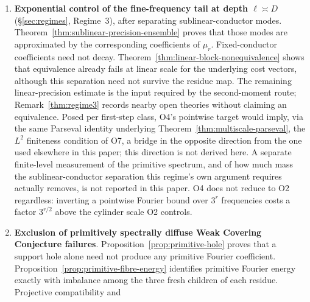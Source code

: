 \documentclass[11pt]{article}
\theoremstyle{definition}
\theoremstyle{remark}
\begin{document}
\begin{enumerate}[label=(O\arabic*)]
  cylinder estimate in O2. Proposition~\ref{prop:complex-deconditioning}
  identifies the conditional local limit theorem needed to pass from
  canonical weights to fixed cost. Theorem~\ref{thm:ensemble-divergence}
  shows that their likelihood gap is at most polynomial at every
  precision, but in the direction opposite to the required lower bound.
  Reading Wirsching's chain directly against the primary source shows
  Conjecture~2's actual target, condition $(\star4)$, is a statement purely
  about the one-dimensional averaging operator $W_3$ carrying no
  information about the residue coordinate the rest of the chain needs;
  a sufficient condition targeting it fails for exactly this reason
  \cite{WirschingCompanion}.
\item \textbf{Exponential control of the fine-frequency tail at depth
  $\ell\asymp D$} (\S\ref{sec:regimes}, Regime~3), after separating
  sublinear-conductor modes. Theorem~\ref{thm:sublinear-precision-ensemble}
  proves that those modes are approximated by the corresponding
  coefficients of $\mu_r$. Fixed-conductor coefficients need not
  decay. Theorem~\ref{thm:linear-block-nonequivalence} shows that
  equivalence already fails at linear scale for the underlying cost
  vectors, although this separation need not survive the residue map.
  The remaining linear-precision estimate is the input
  required by the second-moment route; Remark~\ref{thm:regime3}
  records nearby open theories without claiming an equivalence. Posed
  per first-step class, O4's pointwise target would imply, via the
  same Parseval identity underlying Theorem~\ref{thm:multiscale-parseval},
  the $L^2$ finiteness condition of O7, a bridge in the opposite
  direction from the one used elsewhere in this paper; this direction
  is not derived here. A separate
  finite-level measurement of the primitive spectrum, and of how much
  mass the sublinear-conductor separation this regime's own argument
  requires actually removes, is not reported in this paper. O4 does not
  reduce to O2 regardless: inverting a pointwise Fourier bound over
  $3^r$ frequencies costs a factor $3^{r/2}$ above the cylinder scale
  O2 controls.
\item \textbf{Exclusion of primitively spectrally diffuse Weak Covering
  Conjecture failures}. Proposition~\ref{prop:primitive-hole} proves
  that a support hole alone need not produce any primitive Fourier
  coefficient. Proposition~\ref{prop:primitive-fibre-energy}
  identifies primitive Fourier energy exactly with imbalance among the
  three fresh children of each residue. Projective compatibility and

\end{enumerate}
\end{document}
